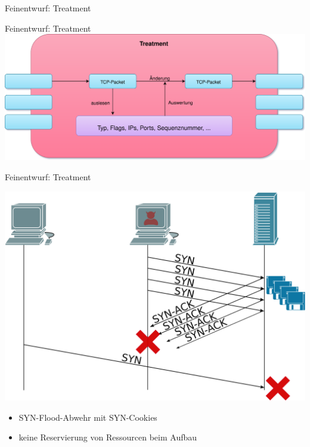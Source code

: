 \documentclass{beamer}
\begin{document}
\begin{frame}{Feinentwurf: Treatment}
\end{frame}

\begin{frame}{Feinentwurf: Treatment}
    \includegraphics[width=\textwidth, center]{Treatment_ohne_Container_mit_Schatten.pdf}
\end{frame}

\begin{frame}{Feinentwurf: Treatment}
    \begin{minipage}[h]{0.45\textwidth}
        \includegraphics[width=\textwidth, center]{SYN-FLOOD.png}
    \end{minipage}
    \hfill
    \begin{minipage}[h]{0.45\textwidth}
        \begin{itemize}
            \item SYN-Flood-Abwehr mit SYN-Cookies
            \item keine Reservierung von Ressourcen beim Aufbau
        \end{itemize}
    \end{minipage}
\end{frame}
\end{document}
